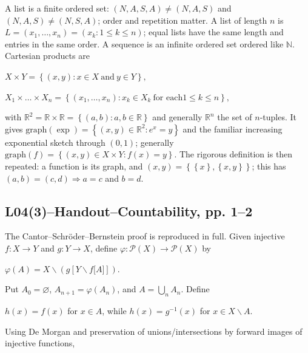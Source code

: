 A list is a finite ordered set: \(\left( {N,A,S,A} \right) \neq \left( {N,A,S} \right)\) and \(\left( {N,A,S} \right) \neq \left( {N,S,A} \right)\); order and repetition matter. A list of length \(n\) is \(L = \left( {x_{1},\ldots,x_{n}} \right) = \left( {x_{k}:1 \leq k \leq n} \right)\); equal lists have the same length and entries in the same order. A sequence is an infinite ordered set ordered like \(\mathbb{N}\). Cartesian products are

\(X \times Y = \left\{ {\left( {x,y} \right):x \in X\ \text{and}\ y \in Y} \right\},\)

\(X_{1} \times \ldots \times X_{n} = \left\{ {\left( {x_{1},\ldots,x_{n}} \right):x_{k} \in X_{k}\ \text{for each}1 \leq k \leq n} \right\},\)

with \(\mathbb{R}^{2} = \mathbb{R} \times \mathbb{R} = \left\{ {\left( {a,b} \right):a,b \in \mathbb{R}} \right\}\) and generally \(\mathbb{R}^{n}\) the set of \(n\)-tuples. It gives \(\text{graph}\left( \exp \right) = \left\{ {\left( {x,y} \right) \in \mathbb{R}^{2}:e^{x} = y} \right\}\) and the familiar increasing exponential sketch through \(\left( {0,1} \right)\); generally \(\text{graph}(f) = \left\{ {\left( {x,y} \right) \in X \times Y:f(x) = y} \right\}\). The rigorous definition is then repeated: a function is its graph, and \(\left( {x,y} \right) = \left\{ {\left\{ x \right\},\left\{ {x,y} \right\}} \right\}\); this has \(\left( {a,b} \right) = \left( {c,d} \right)\Rightarrow a = c\) and \(b = d\).

\subsection{L04(3)--Handout--Countability, pp. 1--2}

The Cantor--Schröder--Bernstein proof is reproduced in full. Given injective \(f:X\rightarrow Y\) and \(g:Y\rightarrow X\), define \(\varphi:\mathcal{P}(X)\rightarrow\mathcal{P}(X)\) by

\(\varphi(A) = X \smallsetminus \left( {g\left\lbrack {Y \smallsetminus f\lbrack A\rbrack} \right\rbrack} \right).\)

Put \(A_{0} = \varnothing\), \(A_{n + 1} = \varphi\left( A_{n} \right)\), and \(A = \bigcup_{n}A_{n}\). Define

\(h(x) = f(x)\) for \(x \in A\), while \(h(x) = g^{- 1}(x)\) for \(x \in X \smallsetminus A\).

Using De Morgan and preservation of unions/intersections by forward images of injective functions,

